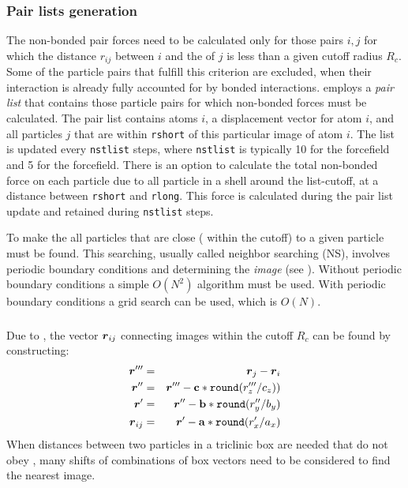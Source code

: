 \subsubsection{Pair lists generation}
The non-bonded pair forces need to be calculated only for those pairs
$i,j$  for which the distance $r_{ij}$ between $i$ and the 
of $j$ is less than a given cutoff radius $R_c$. Some of the particle
pairs that fulfill this criterion are excluded, when their interaction
is already fully accounted for by bonded interactions.  {\gromacs}
employs a {\em pair list} that contains those particle pairs for which
non-bonded forces must be calculated.  The pair list contains atoms
$i$, a displacement vector for atom $i$, and all particles $j$ that
are within \verb'rshort' of this particular image of atom $i$.  The
list is updated every \verb'nstlist' steps, where \verb'nstlist' is
typically 10 for the {\gromacs} forcefield and 5 for the 
forcefield.  There is an option to calculate the total non-bonded
force on each particle due to all particle in a shell around the
list-cutoff, {\ie} at a distance between \verb'rshort' and
\verb'rlong'.  This force is calculated during the pair list update
and  retained during \verb'nstlist' steps.

To make the  all particles that are close
({\ie} within the cutoff) to a given particle must be found.
This searching, usually called neighbor searching (NS),
involves periodic boundary conditions and determining the {\em image}
(see ). Without periodic boundary conditions a simple
$O(N^2)$ algorithm must be used. With periodic boundary conditions
a grid search can be used, which is $O(N)$.

\subsubsection{}
Due to , the vector $\mbox{\boldmath ${r}$}_{ij}$
connecting images within the cutoff $R_c$ can be found by constructing:
\begin{eqnarray}
\ve{r}'''   & = & \ve{r}_j-\ve{r}_i \\
\ve{r}''    & = & \ve{r}''' - {\bf c}*\verb'round'(r'''_z/c_z)) \\
\ve{r}'     & = & \ve{r}'' - {\bf b}*\verb'round'(r''_y/b_y) \\
\ve{r}_{ij} & = & \ve{r}' - {\bf a}*\verb'round'(r'_x/a_x)
\end{eqnarray}
When distances between two particles in a triclinic box are needed
that do not obey ,
many shifts of combinations of box vectors need to be considered to find
the nearest image.

